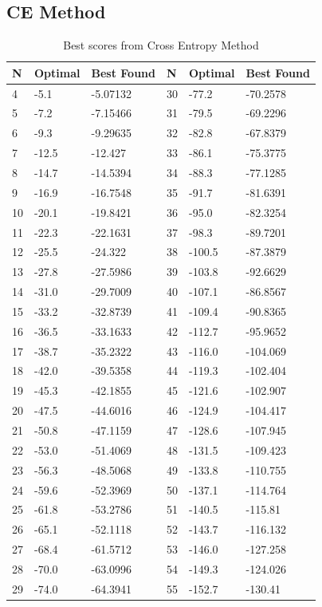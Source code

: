 \documentclass[conference,letterpaper]{IEEEtran}
\begin{document}
\subsection{CE Method}
\begin{table}[!ht]
    \begin{tabularx}{\columnwidth}{XXXXXX}
    N  & Optimal & Best Found & N  & Optimal & Best Found \\ \hline
    4  & -5.1    & -5.07132   & 30 & -77.2   & -70.2578   \\
    5  & -7.2    & -7.15466   & 31 & -79.5   & -69.2296   \\
    6  & -9.3    & -9.29635   & 32 & -82.8   & -67.8379   \\
    7  & -12.5   & -12.427    & 33 & -86.1   & -75.3775   \\
    8  & -14.7   & -14.5394   & 34 & -88.3   & -77.1285   \\
    9  & -16.9   & -16.7548   & 35 & -91.7   & -81.6391   \\
    10 & -20.1   & -19.8421   & 36 & -95.0   & -82.3254   \\
    11 & -22.3   & -22.1631   & 37 & -98.3   & -89.7201   \\
    12 & -25.5   & -24.322    & 38 & -100.5  & -87.3879   \\
    13 & -27.8   & -27.5986   & 39 & -103.8  & -92.6629   \\
    14 & -31.0   & -29.7009   & 40 & -107.1  & -86.8567   \\
    15 & -33.2   & -32.8739   & 41 & -109.4  & -90.8365   \\
    16 & -36.5   & -33.1633   & 42 & -112.7  & -95.9652   \\
    17 & -38.7   & -35.2322   & 43 & -116.0  & -104.069   \\
    18 & -42.0   & -39.5358   & 44 & -119.3  & -102.404   \\
    19 & -45.3   & -42.1855   & 45 & -121.6  & -102.907   \\
    20 & -47.5   & -44.6016   & 46 & -124.9  & -104.417   \\
    21 & -50.8   & -47.1159   & 47 & -128.6  & -107.945   \\
    22 & -53.0   & -51.4069   & 48 & -131.5  & -109.423   \\
    23 & -56.3   & -48.5068   & 49 & -133.8  & -110.755   \\
    24 & -59.6   & -52.3969   & 50 & -137.1  & -114.764   \\
    25 & -61.8   & -53.2786   & 51 & -140.5  & -115.81    \\
    26 & -65.1   & -52.1118   & 52 & -143.7  & -116.132   \\
    27 & -68.4   & -61.5712   & 53 & -146.0  & -127.258   \\
    28 & -70.0   & -63.0996   & 54 & -149.3  & -124.026   \\
    29 & -74.0   & -64.3941   & 55 & -152.7  & -130.41    \\ \hline
    \end{tabularx}
    \caption{Best scores from Cross Entropy Method}
    \label{CE_Results}
\end{table}
\end{document}
